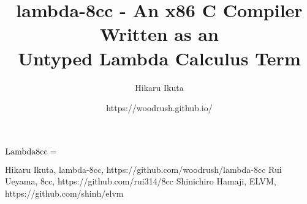 \documentclass[article, 12pt]{article}
\title{lambda-8cc - An x86 C Compiler Written as an \\ Untyped Lambda Calculus Term}
\author{Hikaru Ikuta}
\date{https://woodrush.github.io/}
\begin{document}
\maketitle
${\rm Lambda8cc} =$

\begin{thebibliography}{A99}
     Hikaru Ikuta, lambda-8cc, https://github.com/woodrush/lambda-8cc
     Rui Ueyama, 8cc, https://github.com/rui314/8cc
     Shinichiro Hamaji, ELVM, https://github.com/shinh/elvm
\end{thebibliography}
\end{document}
